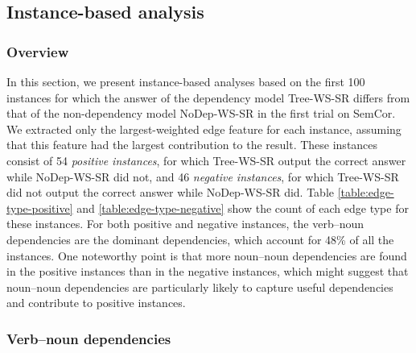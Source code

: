 \documentclass[english]{jnlp_1.4}
\begin{document}
\subsection{Instance-based analysis}

\subsubsection{Overview}

In this section, we present instance-based analyses based on the first 100 instances for which the answer of the dependency model Tree-WS-SR differs from that of the non-dependency model NoDep-WS-SR in the first trial on SemCor.
We extracted only the largest-weighted edge feature for each instance, assuming that this feature had the largest contribution to the result.
These instances consist of 54 \textit{positive instances}, for which Tree-WS-SR output the correct answer while NoDep-WS-SR did not, and 46 \textit{negative instances}, for which Tree-WS-SR did not output the correct answer while NoDep-WS-SR did.
Table \ref{table:edge-type-positive} and \ref{table:edge-type-negative} show the count of each edge type for these instances.
For both positive and negative instances, the verb--noun dependencies are the dominant dependencies, which account for 48\% of all the instances.
One noteworthy point is that more  noun--noun dependencies are found in the positive instances than in the negative instances, which might suggest that noun--noun dependencies are particularly likely to capture useful dependencies and contribute to positive instances.


\begin{table}[t]
\setlength{\captionwidth}{0.45\textwidth}
\begin{minipage}{0.45\textwidth}
\label{table:edge-type-positive}

\end{minipage}
\hfill
\begin{minipage}{0.45\textwidth}
\label{table:edge-type-negative}

\end{minipage}
\end{table} 

\subsubsection{Verb--noun dependencies}
\end{document}
